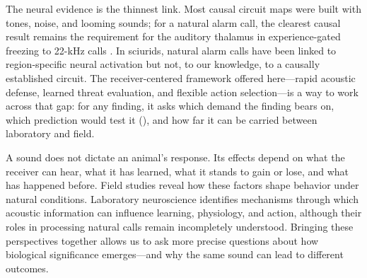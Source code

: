 The neural evidence is the thinnest link. Most causal circuit maps were built with tones, noise, and looming sounds; for a natural alarm call, the clearest causal result remains the requirement for the auditory thalamus in experience-gated freezing to 22-kHz calls \citep{KimEtAl2010}. In sciurids, natural alarm calls have been linked to region-specific neural activation \citep{FreemanEtAl2020} but not, to our knowledge, to a causally established circuit. The receiver-centered framework offered here---rapid acoustic defense, learned threat evaluation, and flexible action selection---is a way to work across that gap: for any finding, it asks which demand the finding bears on, which prediction would test it (), and how far it can be carried between laboratory and field.

A sound does not dictate an animal's response. Its effects depend on what the receiver can hear, what it has learned, what it stands to gain or lose, and what has happened before. Field studies reveal how these factors shape behavior under natural conditions. Laboratory neuroscience identifies mechanisms through which acoustic information can influence learning, physiology, and action, although their roles in processing natural calls remain incompletely understood. Bringing these perspectives together allows us to ask more precise questions about how biological significance emerges---and why the same sound can lead to different outcomes.
